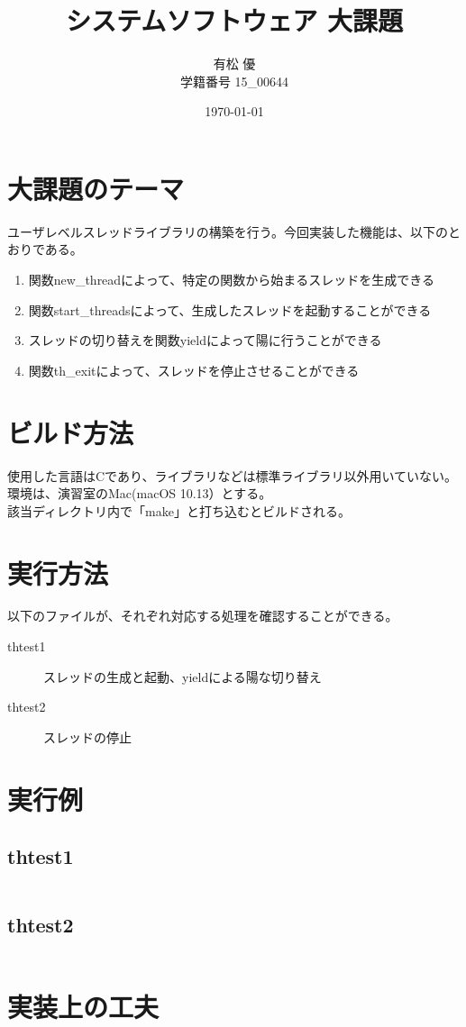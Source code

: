 \documentclass[11pt,a4paper]{jsarticle}
\title{システムソフトウェア 大課題}
\author{有松 優 \\ 学籍番号 15\_00644}
\date{\today}
\begin{document}
\maketitle
%
\hrulefill
\section{大課題のテーマ}
ユーザレベルスレッドライブラリの構築を行う。今回実装した機能は、以下のとおりである。\\
\begin{enumerate}
	\item 関数new_threadによって、特定の関数から始まるスレッドを生成できる
	\item 関数start_threadsによって、生成したスレッドを起動することができる
	\item スレッドの切り替えを関数yieldによって陽に行うことができる
	\item 関数th_exitによって、スレッドを停止させることができる
\end{enumerate}


\section{ビルド方法}
使用した言語はCであり、ライブラリなどは標準ライブラリ以外用いていない。環境は、演習室のMac(macOS 10.13）とする。\\
該当ディレクトリ内で「make」と打ち込むとビルドされる。

\section{実行方法}
以下のファイルが、それぞれ対応する処理を確認することができる。
\begin{description}
 \item[thtest1]スレッドの生成と起動、yieldによる陽な切り替え
 \item[thtest2]スレッドの停止
\end{description}

\section{実行例}
\subsection{thtest1}
\begin{screen}
\begin{verbatim}
\end{verbatim}
\end{screen}

\subsection{thtest2}
\begin{screen}
\begin{verbatim}
\end{verbatim}
\end{screen}

\section{実装上の工夫}

%
%
\end{document}
